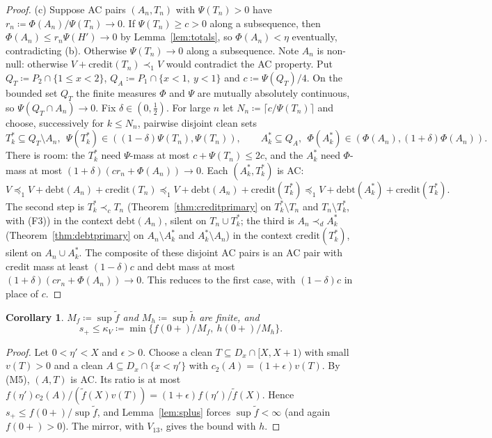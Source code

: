 \documentclass[11pt]{article}
\newtheorem{corollary}[theorem]{Corollary}
\theoremstyle{definition}\newtheorem{definition}[theorem]{Definition}
\theoremstyle{remark}\newtheorem{remark}[theorem]{Remark}
\newcommand{\debt}{\mathrm{debt}}
\newcommand{\cred}{\mathrm{credit}}
\newcommand{\ftil}{\tilde f}
\newcommand{\htil}{\tilde h}
\begin{document}
\begin{proof}
(c) Suppose AC pairs $(A_n,T_n)$ with $\Psi(T_n)>0$ have
$r_n\coloneqq\Phi(A_n)/\Psi(T_n)\to0$. If $\Psi(T_n)\ge c>0$ along a
subsequence, then $\Phi(A_n)\le r_n\Psi(H')\to0$ by Lemma~\ref{lem:totals},
so $\Phi(A_n)<\eta$ eventually, contradicting (b). Otherwise
$\Psi(T_n)\to0$ along a subsequence. Note $A_n$ is non-null: otherwise
$V+\cred(T_n)\prec_1V$ would contradict the AC property. Put
$Q_T\coloneqq P_2\cap\{1\le x<2\}$, $Q_A\coloneqq P_1\cap\{x<1,\ y<1\}$ and
$c\coloneqq\Psi(Q_T)/4$. On the bounded set $Q_T$ the finite measures $\Phi$
and $\Psi$ are mutually absolutely continuous, so $\Psi(Q_T\cap A_n)\to0$.
Fix $\delta\in(0,\frac12)$. For large $n$ let $N_n\coloneqq\lceil
c/\Psi(T_n)\rceil$ and choose, successively for $k\le N_n$, pairwise
disjoint clean sets
\[
 T^*_k\subseteq Q_T\setminus A_n,\ \ \Psi(T^*_k)\in((1-\delta)\Psi(T_n),
 \Psi(T_n)),\qquad
 A^*_k\subseteq Q_A,\ \ \Phi(A^*_k)\in(\Phi(A_n),(1+\delta)\Phi(A_n)).
\]
There is room: the $T^*_k$ need $\Psi$-mass at most $c+\Psi(T_n)\le2c$, and
the $A^*_k$ need $\Phi$-mass at most $(1+\delta)(cr_n+\Phi(A_n))\to0$. Each
$(A^*_k,T^*_k)$ is AC:
\[
 V\preceq_1V+\debt(A_n)+\cred(T_n)\preceq_1V+\debt(A_n)+\cred(T^*_k)
 \preceq_1V+\debt(A^*_k)+\cred(T^*_k).
\]
The second step is $T^*_k\prec_cT_n$ (Theorem~\ref{thm:creditprimary} on
$T^*_k\setminus T_n$ and $T_n\setminus T^*_k$, with (F3)) in the context
$\debt(A_n)$, silent on $T_n\cup T^*_k$; the third is $A_n\prec_dA^*_k$
(Theorem~\ref{thm:debtprimary} on $A_n\setminus A^*_k$ and $A^*_k\setminus
A_n$) in the context $\cred(T^*_k)$, silent on $A_n\cup A^*_k$. The composite
of these disjoint AC pairs is an AC pair with credit mass at least
$(1-\delta)c$ and debt mass at most $(1+\delta)(cr_n+\Phi(A_n))\to0$. This
reduces to the first case, with $(1-\delta)c$ in place of $c$.
\end{proof}

\begin{corollary}\label{cor:kappaV}
$M_f\coloneqq\sup\ftil$ and $M_h\coloneqq\sup\htil$ are finite, and
\[
 s_+\le\kappa_V\coloneqq\min\{f(0+)/M_f,\ h(0+)/M_h\}.
\]
\end{corollary}
\begin{proof}
Let $0<\eta'<X$ and $\epsilon>0$. Choose a clean $T\subseteq
D_x\cap[X,X+1)$ with small $v(T)>0$ and a clean $A\subseteq D_x\cap\{x<\eta'\}$
with $c_2(A)=(1+\epsilon)v(T)$. By (M5), $(A,T)$ is AC. Its ratio is at most
$f(\eta')c_2(A)/(\ftil(X)v(T))=(1+\epsilon)f(\eta')/\ftil(X)$. Hence $s_+\le
f(0+)/\sup\ftil$, and Lemma~\ref{lem:splus} forces $\sup\ftil<\infty$ (and
again $f(0+)>0$). The mirror, with $V_{13}$, gives the bound with $h$.
\end{proof}
\end{document}
